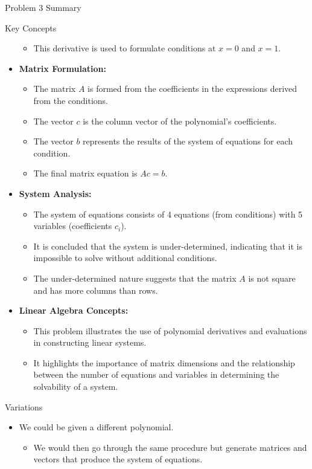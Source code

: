 \begin{summary}{Problem 3 Summary}
\begin{statement}{Key Concepts}
\begin{itemize}
\begin{itemize}
                \item This derivative is used to formulate conditions at $x = 0$ and $x = 1$.
            \end{itemize}
            \item \textbf{Matrix Formulation:}
            \begin{itemize}
                \item The matrix $A$ is formed from the coefficients in the expressions derived from the conditions.
                \item The vector $c$ is the column vector of the polynomial's coefficients.
                \item The vector $b$ represents the results of the system of equations for each condition.
                \item The final matrix equation is $Ac = b$.
            \end{itemize}
            \item \textbf{System Analysis:}
            \begin{itemize}
                \item The system of equations consists of 4 equations (from conditions) with 5 variables (coefficients $c_i$).
                \item It is concluded that the system is under-determined, indicating that it is impossible to solve without additional conditions.
                \item The under-determined nature suggests that the matrix $A$ is not square and has more columns than rows.
            \end{itemize}
            \item \textbf{Linear Algebra Concepts:}
            \begin{itemize}
                \item This problem illustrates the use of polynomial derivatives and evaluations in constructing linear systems.
                \item It highlights the importance of matrix dimensions and the relationship between the number of equations and variables in determining the solvability of a system.
            \end{itemize}
        \end{itemize}
    \end{statement}
    \begin{statement}{Variations}
        \begin{itemize}
            \item We could be given a different polynomial.
            \begin{itemize}
                \item We would then go through the same procedure but generate matrices and vectors that produce the system of equations.
            \end{itemize}
        \end{itemize}
    \end{statement}
\end{summary}

